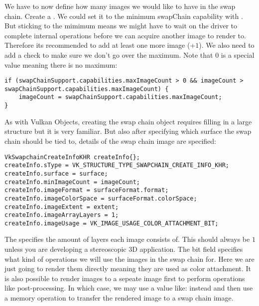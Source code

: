 \par We have to now define how many images we would like to have in the swap chain. Create a . We could set it to the minimum swapChain capability with . But sticking to the mimimum means we might have to wait on the driver to complete internal operations before we can acquire another image to render to. Therefore its recommended to add at least one more image ($+1$). We also need to add a check to make sure we don't go over the maximum. Note that $0$ is a special value meaning there is no maximum:

\begin{center}
\begin{minipage}{0.95\linewidth}
\begin{lstlisting}
if (swapChainSupport.capabilities.maxImageCount > 0 && imageCount > swapChainSupport.capabilities.maxImageCount) {
    imageCount = swapChainSupport.capabilities.maxImageCount;
}
\end{lstlisting}
\end{minipage}
\end{center}

\par As with Vulkan Objects, creating the swap chain object requires filling in a large structure but it is very familiar. But also after specifying which surface the swap chain should be tied to, details of the swap chain image are specified:

\begin{center}
\begin{minipage}{0.95\linewidth}
\begin{lstlisting}
VkSwapchainCreateInfoKHR createInfo{};
createInfo.sType = VK_STRUCTURE_TYPE_SWAPCHAIN_CREATE_INFO_KHR;
createInfo.surface = surface;
createInfo.minImageCount = imageCount;
createInfo.imageFormat = surfaceFormat.format;
createInfo.imageColorSpace = surfaceFormat.colorSpace;
createInfo.imageExtent = extent;
createInfo.imageArrayLayers = 1;
createInfo.imageUsage = VK_IMAGE_USAGE_COLOR_ATTACHMENT_BIT;
\end{lstlisting}
\end{minipage}
\end{center}

\par The  specifies the amount of layers each image consists of. This should always be $1$ unless you are developing a stereoscopic  $3$D application. The  bit field specifies what kind of operations we will use the images in the swap chain for. Here we are just going to render them directly meaning they are used as color attachment. It is also possible to render images to a sepeate image first to perform operations like post-processing. In which case, we may use a value like:
 instead and then use a memory operation to transfer the rendered image to a swap chain image.


